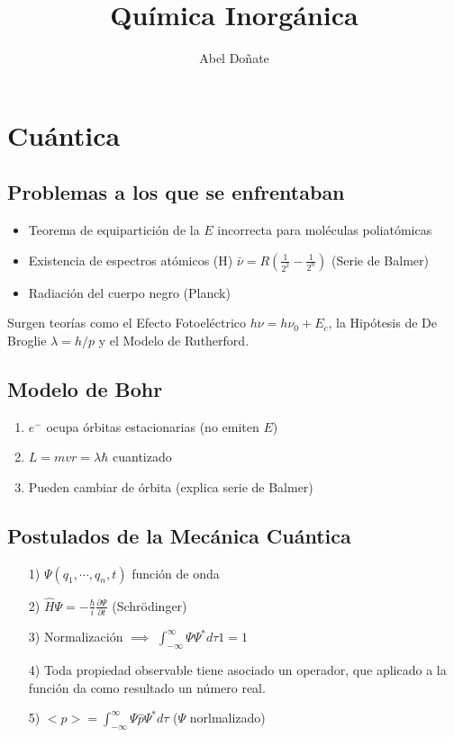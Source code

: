 \documentclass[12pt]{article}
\title{Química Inorgánica}
\author{Abel Doñate}
\date{}
\begin{document}
\maketitle
\tableofcontents
\newpage

\section{Cuántica}
	\subsection{Problemas a los que se enfrentaban}
	\begin{itemize}
		\item Teorema de equipartición de la $E$ incorrecta para moléculas poliatómicas
		\item Existencia de espectros atómicos (H) $\bar{\nu}=R(\frac{1}{2^2}-\frac{1}{2^n})$ (Serie de Balmer)
		\item Radiación del cuerpo negro (Planck) 
	\end{itemize}
	Surgen teorías como el Efecto Fotoeléctrico $h\nu=h\nu_0+E_c$, la Hipótesis de De Broglie $\lambda=h/p$ y el Modelo de Rutherford.
		
	\subsection{Modelo de Bohr}
	\begin{enumerate}[label=\arabic*)]
		\item $e^-$ ocupa órbitas estacionarias (no emiten $E$)
		\item $L=mvr=\lambda \hbar$ cuantizado 
		\item Pueden cambiar de órbita (explica serie de Balmer)
	\end{enumerate}
	
	\subsection{Postulados de la Mecánica Cuántica}
	\begin{itemize}
		\item[1)] $\Psi(q_1, \cdots,q_n,t)$ función de onda
		\item[2)] $\hat{H}\Psi = -\frac{\hbar}{i}\frac{\partial\Psi}{\partial t}$  (Schrödinger)
		\item[3)] Normalización $\implies$   $\int_{-\infty}^\infty{\Psi \Psi^\ast d\tau1=1}$
		\item[4)] Toda propiedad observable tiene asociado un operador, que aplicado a la función da como resultado un número real.
		\item[5)] $<p>= \int_{-\infty}^\infty{\Psi \hat{p} \Psi^\ast d\tau}$   ($\Psi$ norlmalizado)
	\end{itemize}
	
\end{document}
